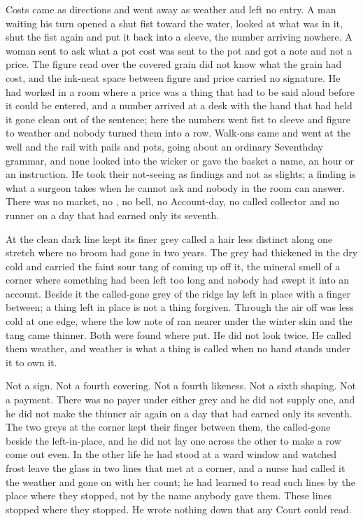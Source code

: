 Costs came as directions and went away as weather and left no entry. A man waiting his turn opened a shut fist toward the water, looked at what was in it, shut the fist again and put it back into a sleeve, the number arriving nowhere. A woman sent to ask what a pot cost was sent to the pot and got a note and not a price. The figure read over the covered grain did not know what the grain had cost, and the ink-neat space between figure and price carried no signature. He had worked in a room where a price was a thing that had to be said aloud before it could be entered, and a number arrived at a desk with the hand that had held it gone clean out of the sentence; here the numbers went fist to sleeve and figure to weather and nobody turned them into a row. Walk-ons came and went at the well and the rail with pails and pots, going about an ordinary Seventhday grammar, and none looked into the wicker or gave the basket a name, an hour or an instruction. He took their not-seeing as findings and not as slights; a finding is what a surgeon takes when he cannot ask and nobody in the room can answer. There was no market, no , no bell, no Account-day, no called collector and no runner on a day that had earned only its seventh.

\scenebreak

At  the clean dark line kept its finer grey called  a hair less distinct along one stretch where no broom had gone in two years. The grey had thickened in the dry cold and carried the faint sour tang of  coming up off it, the mineral smell of a corner where something had been left too long and nobody had swept it into an account. Beside it the called-gone grey of the ridge lay left in place with a finger between; a thing left in place is not a thing forgiven. Through  the air off  was less cold at one edge, where the low note of  ran nearer under the winter skin and the tang came thinner. Both were found where put. He did not look twice. He called them weather, and weather is what a thing is called when no hand stands under it to own it.

Not a sign. Not a fourth covering. Not a fourth likeness. Not a sixth shaping. Not a payment. There was no payer under either grey and he did not supply one, and he did not make the thinner air again on a day that had earned only its seventh. The two greys at the corner kept their finger between them, the called-gone beside the left-in-place, and he did not lay one across the other to make a row come out even. In the other life he had stood at a ward window and watched frost leave the glass in two lines that met at a corner, and a nurse had called it the weather and gone on with her count; he had learned to read such lines by the place where they stopped, not by the name anybody gave them. These lines stopped where they stopped. He wrote nothing down that any Court could read.

